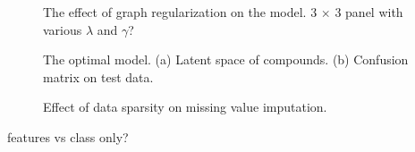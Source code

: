 \documentclass[11pt, oneside]{article}
\begin{document}
\begin{figure}[h!]
	\caption{The effect of graph regularization on the model. 3 $\times$ 3 panel with various $\lambda$ and $\gamma$?}
\end{figure}

\begin{figure}[h!]
	\caption{The optimal model. (a) Latent space of compounds. (b) Confusion matrix on test data.}
\end{figure}

\begin{figure}[h!]
	\caption{Effect of data sparsity on missing value imputation.}
\end{figure}

features vs class only?





\end{document}
